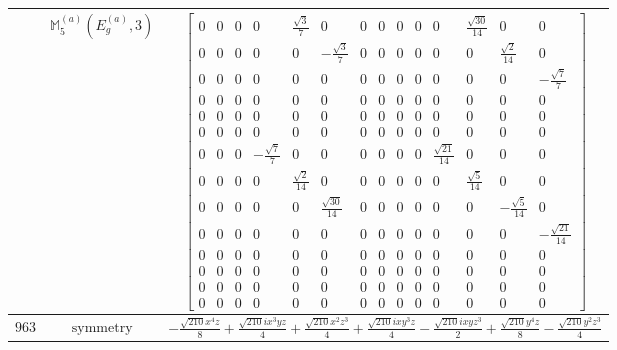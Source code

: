 \documentclass[fleqn,8pt,landscape]{jsarticle}
\begin{document}
\begin{longtable}{ccc}
$  $ & $ \mathbb{M}_{5}^{(a)}(E_{g}^{(a)},3) $ & $ \begin{bmatrix} 0 & 0 & 0 & 0 & \frac{\sqrt{3}}{7} & 0 & 0 & 0 & 0 & 0 & 0 & \frac{\sqrt{30}}{14} & 0 & 0 \\ 0 & 0 & 0 & 0 & 0 & - \frac{\sqrt{3}}{7} & 0 & 0 & 0 & 0 & 0 & 0 & \frac{\sqrt{2}}{14} & 0 \\ 0 & 0 & 0 & 0 & 0 & 0 & 0 & 0 & 0 & 0 & 0 & 0 & 0 & - \frac{\sqrt{7}}{7} \\ 0 & 0 & 0 & 0 & 0 & 0 & 0 & 0 & 0 & 0 & 0 & 0 & 0 & 0 \\ 0 & 0 & 0 & 0 & 0 & 0 & 0 & 0 & 0 & 0 & 0 & 0 & 0 & 0 \\ 0 & 0 & 0 & 0 & 0 & 0 & 0 & 0 & 0 & 0 & 0 & 0 & 0 & 0 \\ 0 & 0 & 0 & - \frac{\sqrt{7}}{7} & 0 & 0 & 0 & 0 & 0 & 0 & \frac{\sqrt{21}}{14} & 0 & 0 & 0 \\ 0 & 0 & 0 & 0 & \frac{\sqrt{2}}{14} & 0 & 0 & 0 & 0 & 0 & 0 & \frac{\sqrt{5}}{14} & 0 & 0 \\ 0 & 0 & 0 & 0 & 0 & \frac{\sqrt{30}}{14} & 0 & 0 & 0 & 0 & 0 & 0 & - \frac{\sqrt{5}}{14} & 0 \\ 0 & 0 & 0 & 0 & 0 & 0 & 0 & 0 & 0 & 0 & 0 & 0 & 0 & - \frac{\sqrt{21}}{14} \\ 0 & 0 & 0 & 0 & 0 & 0 & 0 & 0 & 0 & 0 & 0 & 0 & 0 & 0 \\ 0 & 0 & 0 & 0 & 0 & 0 & 0 & 0 & 0 & 0 & 0 & 0 & 0 & 0 \\ 0 & 0 & 0 & 0 & 0 & 0 & 0 & 0 & 0 & 0 & 0 & 0 & 0 & 0 \\ 0 & 0 & 0 & 0 & 0 & 0 & 0 & 0 & 0 & 0 & 0 & 0 & 0 & 0 \end{bmatrix} $ \\ \hline
$ 963 $ & $ \text{symmetry} $ & $ - \frac{\sqrt{210} x^{4} z}{8} + \frac{\sqrt{210} i x^{3} y z}{4} + \frac{\sqrt{210} x^{2} z^{3}}{4} + \frac{\sqrt{210} i x y^{3} z}{4} - \frac{\sqrt{210} i x y z^{3}}{2} + \frac{\sqrt{210} y^{4} z}{8} - \frac{\sqrt{210} y^{2} z^{3}}{4} $ \\

\end{longtable}
\end{document}
